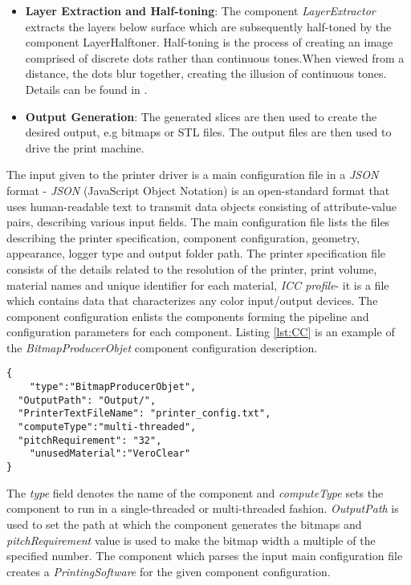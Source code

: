 \begin{itemize}
\item \textbf{Layer Extraction and Half-toning}: The component \textit{LayerExtractor} extracts the layers below surface which are subsequently half-toned by the component LayerHalftoner. Half-toning is the process of creating an image comprised of discrete dots rather than continuous tones.When viewed from a distance, the dots blur together, creating the illusion of continuous tones. Details can be found in \cite{Brunton}. \newline

\item \textbf{Output Generation}: The generated slices are then used to create the desired output, e.g bitmaps or STL files. The output files are then used to drive the print machine. \newline

\end{itemize} 

The input given to the printer driver is a main configuration file in a \textit{JSON} format - \textit{JSON} (JavaScript Object Notation) is an open-standard format that uses human-readable text to transmit data objects consisting of attribute-value pairs, describing various input fields. The main configuration file lists the files describing the printer specification, component configuration, geometry, appearance, logger type and output folder path. The printer specification file consists of the details related to the resolution of the printer, print volume, material names and unique identifier for each material, \textit{ICC profile}- it is a file which contains data that characterizes any color input/output devices. The component configuration enlists the components forming the pipeline and configuration parameters for each component. Listing \ref{lst:CC} is an example of the \textit{BitmapProducerObjet} component configuration description. \newline

\begin{lstlisting}[label={lst:CC},caption={\textit{BitmapProducerObjet} Component Configuration}]
{
	"type":"BitmapProducerObjet",
  "OutputPath": "Output/",
  "PrinterTextFileName": "printer_config.txt",
  "computeType":"multi-threaded",
  "pitchRequirement": "32",
	"unusedMaterial":"VeroClear"
}
\end{lstlisting}

The \textit{type} field denotes the name of the component and \textit{computeType} sets the component to run in a single-threaded or multi-threaded fashion. \textit{OutputPath} is used to set the path at which the component generates the bitmaps and \textit{pitchRequirement} value is used to make the bitmap width a multiple of the specified number. The component which parses the input main configuration file creates a \textit{PrintingSoftware} for the given component configuration. 

